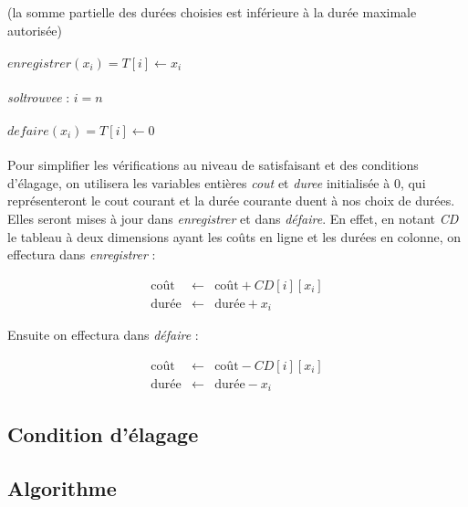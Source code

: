 \documentclass[a4paper, titlepage]{article}
\begin{document}
		(la somme partielle des durées choisies est inférieure à la durée maximale autorisée)

		\paragraph{}\noindent
		$enregistrer(x_{i}) = T[i] \leftarrow x_{i}$

		\paragraph{}\noindent
		\emph{soltrouvee} : $i = n$

		\paragraph{}\noindent
		$defaire(x_{i}) = T[i] \leftarrow 0$

		\paragraph{}
		Pour simplifier les vérifications au niveau de satisfaisant et des conditions d'élagage, on utilisera les variables entières \emph{cout} et \emph{duree} initialisée à 0,
		qui représenteront le cout courant et la durée courante duent à nos choix de durées.
		Elles seront mises à jour dans \emph{enregistrer} et dans \emph{défaire}.
		En effet, en notant \emph{CD} le tableau à deux dimensions ayant les coûts en ligne et les durées en colonne, on effectura dans \emph{enregistrer} :

			\begin{eqnarray*}
				\mbox{coût}  & \leftarrow & \mbox{coût} + CD[i][x_{i}] \\
				\mbox{durée} & \leftarrow & \mbox{durée} + x_{i}
			\end{eqnarray*}

		Ensuite on effectura dans \emph{défaire} :

			\begin{eqnarray*}
				\mbox{coût}  & \leftarrow & \mbox{coût} - CD[i][x_{i}] \\
				\mbox{durée} & \leftarrow & \mbox{durée} - x_{i}
			\end{eqnarray*}

	\subsection{Condition d'élagage}


	\subsection{Algorithme}
\end{document}
